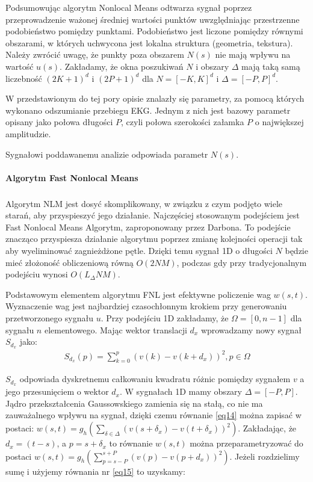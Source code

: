 \documentclass[a4paper]{article}
\begin{document}
Podsumowując algorytm Nonlocal Means odtwarza sygnał poprzez przeprowadzenie ważonej średniej wartości punktów uwzględniając przestrzenne podobieństwo pomiędzy punktami. Podobieństwo jest liczone pomiędzy równymi obszarami, w których uchwycona jest lokalna struktura (geometria, tekstura). Należy zwrócić uwagę, że punkty poza obszarem $N(s)$ nie mają wpływu na wartość $u(s)$.
Zakładamy, że okna poszukiwań $N$ i obszary $\Delta$ mają taką samą liczebność $(2K+1)^d$ i $(2P+1)^d$ dla $N = [-K,K]^d$ i $\Delta = [-P,P]^d$. 

W przedstawionym do tej pory opisie znalazły się parametry, za pomocą których wykonano odszumianie przebiegu EKG. Jednym z nich jest bazowy parametr opisany jako połowa długości $P$, czyli połowa szerokości załamka $P$ o największej amplitudzie.

Sygnałowi poddawanemu analizie odpowiada parametr $N(s)$\cite{darbon}\cite{tracey}.

\paragraph{Algorytm Fast Nonlocal Means}
\subparagraph{}

 Algorytm NLM jest dosyć skomplikowany, w związku z czym podjęto wiele starań, aby przyspieszyć jego działanie. Najczęściej stosowanym podejściem jest Fast Nonlocal Means Algorytm, zaproponowany przez Darbona. To podejście znacząco przyspiesza działanie algorytmu poprzez zmianę kolejności operacji tak aby wyeliminować zagnieżdżone pętle. Dzięki temu sygnał 1D o długości $N$ będzie mieć złożoność obliczeniową równą $O(2NM)$, podczas gdy przy tradycjonalnym podejściu wynosi $O(L_{\Delta}NM)$.

Podstawowym elementem algorytmu FNL jest efektywne policzenie wag $w(s,t)$. Wyznaczenie wag jest najbardziej czasochłonnym krokiem przy generowaniu przetworzonego sygnału $u$. Przy podejściu 1D zakładamy, że $\Omega = [0,n-1]$ dla sygnału $n$ elementowego. 
Mając wektor translacji $d_{x}$ wprowadzamy nowy sygnał $S_{d_{x}}$ jako:
\begin{equation}\label{eq15}
\begin{split}
S_{d_{x}}(p) = \displaystyle\sum_{k=0}^{p}(v(k)-v(k+d_{x}))^2 , p\in{\Omega}
\end{split}
\end{equation}

$S_{d_{x}} $ odpowiada dyskretnemu całkowaniu kwadratu różnic pomiędzy sygnałem $v$ a jego przesunięciem o wektor $d_{x}$. W sygnałach 1D mamy obszary $\Delta = [-P,P]$. Jądro przekształcenia Gaussowskiego zamienia się na stałą, co nie ma zauważalnego wpływu na sygnał, dzięki czemu równanie \ref{eq14} można zapisać w postaci: $w(s,t) = g_{h}(\sum_{\delta\in{\Delta}}(v(s+\delta_{x}) - v(t+\delta_{x}))^2)$. Zakładając, że $d_{x} = (t-s)$, a $p=s+\delta_{x}$ to równanie $w(s,t)$ można przeparametryzować do postaci $w(s,t) = g_{h}(\sum_{p=s-P}^{s+P}(v(p) - v(p+d_{x}))^2)$. Jeżeli rozdzielimy sumę i użyjemy równania nr \ref{eq15} to uzyskamy: 
\end{document}
